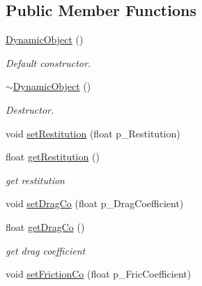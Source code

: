 \subsection*{Public Member Functions}
\begin{DoxyCompactItemize}
\item 
\mbox{\label{class_dynamic_object_a50a7adf3d7d1f411ed2aa9a663bfe275}} 
\hyperlink{class_dynamic_object_a50a7adf3d7d1f411ed2aa9a663bfe275}{Dynamic\+Object} ()
\begin{DoxyCompactList}\small\item\em Default constructor. \end{DoxyCompactList}\item 
\mbox{\label{class_dynamic_object_a149b612e1f0288b115178874bd0cba93}} 
\hyperlink{class_dynamic_object_a149b612e1f0288b115178874bd0cba93}{$\sim$\+Dynamic\+Object} ()
\begin{DoxyCompactList}\small\item\em Destructor. \end{DoxyCompactList}\item 
void \hyperlink{class_dynamic_object_a0a0a7729f35bd16156a2fbb75d50ea1c}{set\+Restitution} (float p\+\_\+\+Restitution)
\item 
\mbox{\label{class_dynamic_object_a6637df2539ca0aa1a4eed8636863dfac}} 
float \hyperlink{class_dynamic_object_a6637df2539ca0aa1a4eed8636863dfac}{get\+Restitution} ()
\begin{DoxyCompactList}\small\item\em get restitution \end{DoxyCompactList}\item 
void \hyperlink{class_dynamic_object_ae3d4fa8bda00ba66b59ade0e01abbec5}{set\+Drag\+Co} (float p\+\_\+\+Drag\+Coefficient)
\item 
\mbox{\label{class_dynamic_object_a60373c87f1803073f1e5113913828f4f}} 
float \hyperlink{class_dynamic_object_a60373c87f1803073f1e5113913828f4f}{get\+Drag\+Co} ()
\begin{DoxyCompactList}\small\item\em get drag coefficient \end{DoxyCompactList}\item 
void \hyperlink{class_dynamic_object_af6fdf32b8d48afff90e68b2c87d9afe5}{set\+Friction\+Co} (float p\+\_\+\+Fric\+Coefficient)

\end{DoxyCompactItemize}
